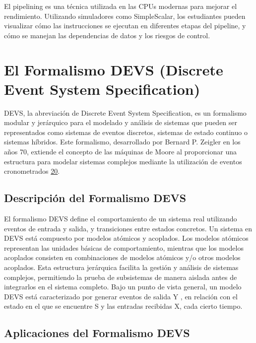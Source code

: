 \documentclass[12pt,twoside]{templates/unerthesis}
\begin{document}
El pipelining es una técnica utilizada en las CPUs modernas para mejorar el rendimiento. Utilizando simuladores como SimpleScalar, los estudiantes pueden visualizar cómo las instrucciones se ejecutan en diferentes etapas del pipeline, y cómo se manejan las dependencias de datos y los riesgos de control.

\hypertarget{el-formalismo-devs-discrete-event-system-specification}{%
\section{El Formalismo DEVS (Discrete Event System Specification)}\label{el-formalismo-devs-discrete-event-system-specification}}

DEVS, la abreviación de Discrete Event System Specification, es un formalismo modular y jerárquico para el modelado y análisis de sistemas que pueden ser representados como sistemas de eventos discretos, sistemas de estado continuo o sistemas híbridos. Este formalismo, desarrollado por Bernard P. Zeigler en los años 70, extiende el concepto de las máquinas de Moore al proporcionar una estructura para modelar sistemas complejos mediante la utilización de eventos cronometrados \protect\hyperlink{ref-zeigler_theory_2000}{20}.

\hypertarget{descripciuxf3n-del-formalismo-devs}{%
\subsection{Descripción del Formalismo DEVS}\label{descripciuxf3n-del-formalismo-devs}}

El formalismo DEVS define el comportamiento de un sistema real utilizando eventos de entrada y salida, y transiciones entre estados concretos. Un sistema en DEVS está compuesto por modelos atómicos y acoplados. Los modelos atómicos representan las unidades básicas de comportamiento, mientras que los modelos acoplados consisten en combinaciones de modelos atómicos y/o otros modelos acoplados. Esta estructura jerárquica facilita la gestión y análisis de sistemas complejos, permitiendo la prueba de subsistemas de manera aislada antes de integrarlos en el sistema completo.
Bajo un punto de vista general, un modelo DEVS está caracterizado por generar eventos de salida Y , en relación con el estado en el que se encuentre S y las entradas recibidas X, cada cierto tiempo.

\hypertarget{aplicaciones-del-formalismo-devs}{%
\subsection{Aplicaciones del Formalismo DEVS}\label{aplicaciones-del-formalismo-devs}}
\end{document}
